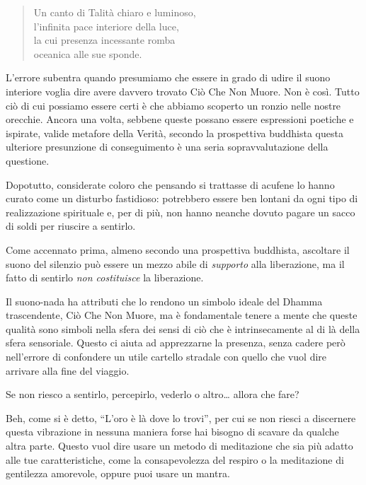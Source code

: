 \begin{quotation}
Un canto di Talità chiaro e luminoso,\\
l'infinita pace interiore della luce,\\
la cui presenza incessante romba\\
oceanica alle sue
sponde.\cite{portrait}
\end{quotation}

L'errore subentra quando presumiamo che essere in grado di udire il
suono interiore voglia dire avere davvero trovato Ciò Che Non Muore. Non
è così. Tutto ciò di cui possiamo essere certi è che abbiamo scoperto un
ronzio nelle nostre orecchie. Ancora una volta, sebbene queste possano
essere espressioni poetiche e ispirate, valide metafore della Verità,
secondo la prospettiva buddhista questa ulteriore presunzione di
conseguimento è una seria sopravvalutazione della questione.

Dopotutto, considerate coloro che pensando si trattasse di acufene lo
hanno curato come un disturbo fastidioso: potrebbero essere ben lontani
da ogni tipo di realizzazione spirituale e, per di più, non hanno
neanche dovuto pagare un sacco di soldi per riuscire a sentirlo.

Come accennato prima, almeno secondo una prospettiva buddhista,
ascoltare il suono del silenzio può essere un mezzo abile di
\emph{supporto} alla liberazione, ma il fatto di sentirlo \emph{non
costituisce} la liberazione.

Il suono-nada ha attributi che lo rendono un simbolo ideale del Dhamma
trascendente, Ciò Che Non Muore, ma è fondamentale tenere a mente che
queste qualità sono simboli nella sfera dei sensi di ciò che è
intrinsecamente al di là della sfera sensoriale. Questo ci aiuta ad
apprezzarne la presenza, senza cadere però nell'errore di confondere un
utile cartello stradale con quello che vuol dire arrivare alla fine del
viaggio.

\smallskip

Se non riesco a sentirlo, percepirlo, vederlo o altro\ldots{}
allora che fare?

Beh, come si è detto, ``L'oro è là dove lo trovi'', per cui se non
riesci a discernere questa vibrazione in nessuna maniera forse hai
bisogno di scavare da qualche altra parte. Questo vuol dire usare un
metodo di meditazione che sia più adatto alle tue caratteristiche, come
la consapevolezza del respiro o la meditazione di gentilezza amorevole,
oppure puoi usare un mantra.

